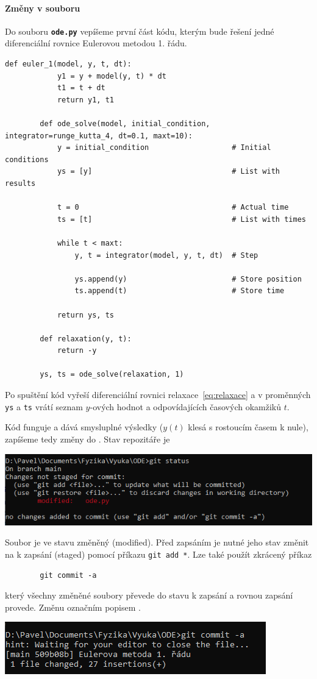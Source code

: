 \documentclass[a4paper,11pt,twoside]{article}
\newcommand{\subsubsubsection}[1]{\paragraph{#1}\mbox{}

}
\def\code#1{\textnormal{\texttt{#1}}}
\def\file#1{\textnormal{\textbf{\texttt{#1}}}}
\theoremstyle{red}
\theoremstyle{green}
\begin{document}
\subsubsubsection{Změny v souboru}
    Do souboru \file{ode.py} vepíšeme první část kódu, kterým bude řešení jedné diferenciální rovnice Eulerovou metodou 1. řádu.

    \begin{lstlisting}[style=TinyPython]
        def euler_1(model, y, t, dt):
            y1 = y + model(y, t) * dt
            t1 = t + dt
            return y1, t1
        
        def ode_solve(model, initial_condition, integrator=runge_kutta_4, dt=0.1, maxt=10):
            y = initial_condition                   # Initial conditions
            ys = [y]                                # List with results
            
            t = 0                                   # Actual time
            ts = [t]                                # List with times
            
            while t < maxt:
                y, t = integrator(model, y, t, dt)  # Step
                
                ys.append(y)                        # Store position
                ts.append(t)                        # Store time
                    
            return ys, ts
        
        def relaxation(y, t):
            return -y
        
        ys, ts = ode_solve(relaxation, 1)\end{lstlisting}
    Po spuštění kód vyřeší diferenciální rovnici relaxace~\eqref{eq:relaxace} a v proměnných \code{ys} a \code{ts} vrátí seznam $y$-ových hodnot a odpovídajících časových okamžiků $t$.

    Kód funguje a dává smysluplné výsledky ($y(t)$ klesá s rostoucím časem k nule), zapíšeme tedy změny do .
    Stav repozitáře je
    \begin{center}\includegraphics[width=0.7\linewidth]{GitStatusChange.png}\end{center}
    Soubor je ve stavu změněný (modified).
    Před zapsáním je nutné jeho stav změnit na k zapsání (staged) pomocí příkazu \code{git add *}.
    Lze také použít zkrácený příkaz
    \begin{lstlisting}
        git commit -a\end{lstlisting}
    který všechny změněné soubory převede do stavu k zapsání a rovnou zapsání provede.
    Změnu označním popisem .
    \begin{center}\includegraphics[width=0.5\linewidth]{GitStatusCommit2.png}\end{center}
\end{document}
